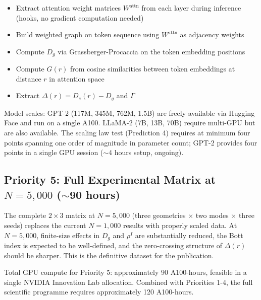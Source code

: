 \documentclass[11pt,a4paper]{article}
\begin{document}
\begin{itemize}
\item Extract attention weight matrices $W^{\text{attn}}$ from each layer during inference (hooks, no gradient computation needed)

\item Build weighted graph on token sequence using $W^{\text{attn}}$ as adjacency weights

\item Compute $D_g$ via Grassberger-Procaccia on the token embedding positions

\item Compute $G(r)$ from cosine similarities between token embeddings at distance $r$ in attention space

\item Extract $\Delta(r) = D_e(r) - D_g$ and $\Gamma$
\end{itemize}

Model scales: GPT-2 (117M, 345M, 762M, 1.5B) are freely available via Hugging Face and run on a single A100. LLaMA-2 (7B, 13B, 70B) require multi-GPU but are also available. The scaling law test (Prediction 4) requires at minimum four points spanning one order of magnitude in parameter count; GPT-2 provides four points in a single GPU session ($\sim$4 hours setup, ongoing).

\subsection{Priority 5: Full Experimental Matrix at $N = 5{,}000$ ($\sim$90 hours)}

The complete $2\times3$ matrix at $N = 5{,}000$ (three geometries $\times$ two modes $\times$ three seeds) replaces the current $N = 1{,}000$ results with properly scaled data. At $N = 5{,}000$, finite-size effects in $D_g$ and $\rho^I$ are substantially reduced, the Bott index is expected to be well-defined, and the zero-crossing structure of $\Delta(r)$ should be sharper. This is the definitive dataset for the publication.

Total GPU compute for Priority 5: approximately 90 A100-hours, feasible in a single NVIDIA Innovation Lab allocation. Combined with Priorities 1-4, the full scientific programme requires approximately 120 A100-hours.
\end{document}
